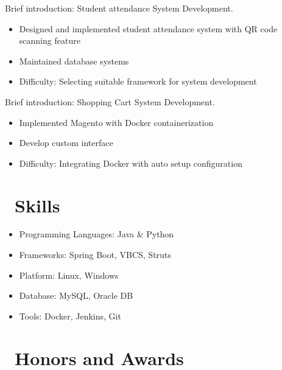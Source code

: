 \documentclass{resume}
\begin{document}
Brief introduction: Student attendance System Development.
\begin{itemize}
  \item Designed and implemented student attendance system with QR code scanning feature
  \item Maintained database systems
  \item Difficulty: Selecting suitable framework for system development
\end{itemize}
Brief introduction: Shopping Cart System Development.
\begin{itemize}
  \item Implemented Magento with Docker containerization
  \item Develop custom interface
  \item Difficulty: Integrating Docker with auto setup configuration
\end{itemize}

\section{\faCogs\ Skills}
\begin{itemize}[parsep=0.5ex]
  \item Programming Languages: Java & Python
  \item Frameworks: Spring Boot, VBCS, Struts
  \item Platform: Linux, Windows
  \item Database: MySQL, Oracle DB
  \item Tools: Docker, Jenkins, Git
\end{itemize}

\section{\faHeartO\ Honors and Awards}

%
%
\end{document}
